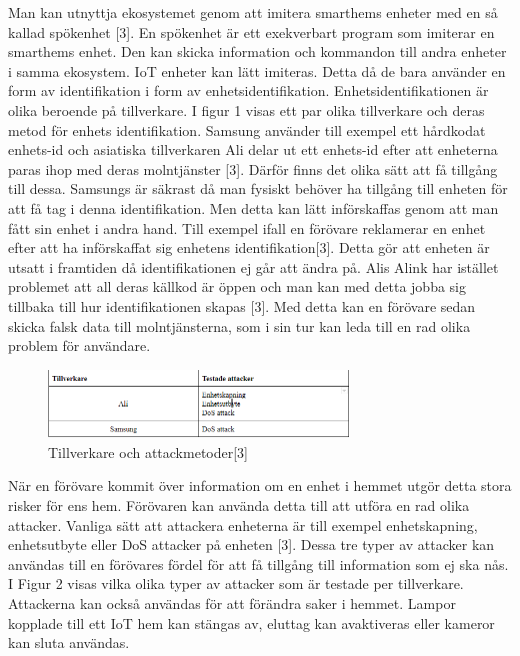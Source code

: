 \documentclass[conference]{IEEEtran}
\begin{document}
Man kan utnyttja ekosystemet genom att imitera smarthems enheter med en så kallad spökenhet [3].  En spökenhet är ett exekverbart program som imiterar en smarthems enhet. Den kan skicka information och kommandon till andra enheter i samma ekosystem. IoT enheter kan lätt imiteras. Detta då de bara använder en form av identifikation i form av enhetsidentifikation. Enhetsidentifikationen är olika beroende på tillverkare. I figur 1 visas ett par olika tillverkare och deras metod för enhets identifikation. Samsung använder till exempel ett hårdkodat enhets-id och asiatiska tillverkaren Ali delar ut ett enhets-id efter att enheterna paras ihop med deras molntjänster [3]. Därför finns det olika sätt att få tillgång till dessa. Samsungs är säkrast då man fysiskt behöver ha tillgång till enheten för att få tag i denna identifikation. Men detta kan lätt införskaffas genom att man fått sin enhet i andra hand. Till exempel ifall en förövare reklamerar en enhet efter att ha införskaffat sig enhetens identifikation[3]. Detta gör att enheten är utsatt i framtiden då identifikationen ej går att ändra på. Alis Alink har istället problemet att all deras källkod är öppen och man kan med detta jobba sig tillbaka till hur identifikationen skapas [3]. Med detta kan en förövare sedan skicka falsk data till molntjänsterna, som i sin tur kan leda till en rad olika problem för användare.

\begin{figure}[htp]
    \centering
    \includegraphics[width=8cm]{fig2.PNG}
    \caption{Tillverkare och attackmetoder[3]}
    \label{fig:Tabell 2}
\end{figure}

När en förövare kommit över information om en enhet i hemmet utgör detta stora risker för ens hem. Förövaren kan använda detta till att utföra en rad olika attacker. Vanliga sätt att attackera enheterna är till exempel enhetskapning, enhetsutbyte eller DoS attacker på enheten [3]. Dessa tre typer av attacker kan användas till en förövares fördel för att få tillgång till information som ej ska nås. I Figur 2 visas vilka olika typer av attacker som är testade per tillverkare.   Attackerna kan också användas för att förändra saker i hemmet. Lampor kopplade till ett IoT hem kan stängas av, eluttag kan avaktiveras eller kameror kan sluta användas. 
\end{document}
